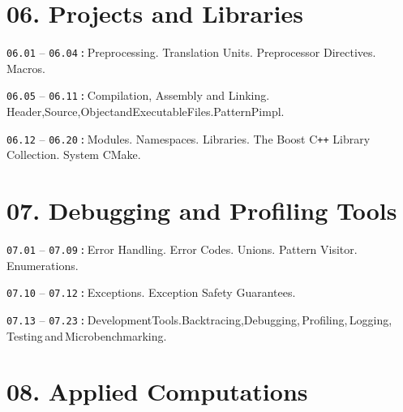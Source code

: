 \documentclass[a4paper,12pt]{article}
\renewenvironment{itemize}
{
    \begin{list}{\labelitemi}
    {
      \setlength{\topsep}{0pt}
      \setlength{\partopsep}{0pt}
      \setlength{\parskip}{0pt}
      \setlength{\itemsep}{0pt}
      \setlength{\parsep}{0pt}
      \setlength{\leftmargin}{14.5pt}
    }
}{\end{list}}
\begin{document}
\section{06. Projects and Libraries}

\begin{itemize}

    \item \texttt{06.01} -- \texttt{06.04}\,\texttt{:}\,Preprocessing. Translation Units. Preprocessor Directives. Macros.

    \smallskip

    \item \texttt{06.05} -- \texttt{06.11}\,\texttt{:}\,Compilation, Assembly and Linking. Header,\:Source,\:Object\:and\:Executable\:Files.\:Pattern\:Pimpl.

    \smallskip

    \item \texttt{06.12} -- \texttt{06.20}\,\texttt{:}\,Modules. Namespaces.  Libraries. The Boost C\texttt{++} Library Collection. System CMake.

    \smallskip
    
\end{itemize}

\section{07. Debugging and Profiling Tools}

\begin{itemize}

    \item \texttt{07.01} -- \texttt{07.09}\,\texttt{:}\,Error Handling. Error Codes. Unions. Pattern Visitor. Enumerations.

    \smallskip

    \item \texttt{07.10} -- \texttt{07.12}\,\texttt{:}\,Exceptions. Exception Safety Guarantees.

    \smallskip

    \item \texttt{07.13} -- \texttt{07.23}\,\texttt{:}\,Development\:Tools.\:Backtracing,\:Debugging,\,Profiling,\,Logging,\,Testing\,and\,Microbenchmarking.
    
\end{itemize}

\section{08. Applied Computations}
\end{document}
